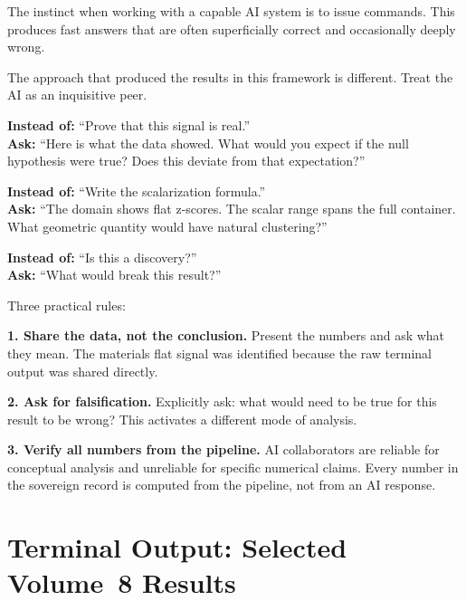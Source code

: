 \documentclass[11pt, letterpaper, openany]{book}
\begin{document}
The instinct when working with a capable AI system is to issue commands. This
produces fast answers that are often superficially correct and occasionally deeply
wrong.

The approach that produced the results in this framework is different. Treat the AI
as an inquisitive peer.

\textbf{Instead of:} ``Prove that this signal is real.''\\
\textbf{Ask:} ``Here is what the data showed. What would you expect if the null
hypothesis were true? Does this deviate from that expectation?''

\textbf{Instead of:} ``Write the scalarization formula.''\\
\textbf{Ask:} ``The domain shows flat z-scores. The scalar range spans the full
container. What geometric quantity would have natural clustering?''

\textbf{Instead of:} ``Is this a discovery?''\\
\textbf{Ask:} ``What would break this result?''

Three practical rules:

\textbf{1. Share the data, not the conclusion.} Present the numbers and ask what
they mean. The materials flat signal was identified because the raw terminal output
was shared directly.

\textbf{2. Ask for falsification.} Explicitly ask: what would need to be true for
this result to be wrong? This activates a different mode of analysis.

\textbf{3. Verify all numbers from the pipeline.} AI collaborators are reliable
for conceptual analysis and unreliable for specific numerical claims. Every number
in the sovereign record is computed from the pipeline, not from an AI response.

\clearpage

\chapter{Terminal Output: Selected Volume~8 Results}
\end{document}
